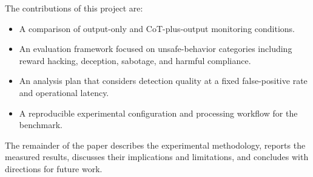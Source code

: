 The contributions of this project are:

\begin{itemize}
    \item A comparison of output-only and CoT-plus-output monitoring
    conditions.

    \item An evaluation framework focused on unsafe-behavior categories
    including reward hacking, deception, sabotage, and harmful compliance.

    \item An analysis plan that considers detection quality at a fixed
    false-positive rate and operational latency.

    \item A reproducible experimental configuration and processing
    workflow for the benchmark.
\end{itemize}

The remainder of the paper describes the experimental methodology,
reports the measured results, discusses their implications and
limitations, and concludes with directions for future work.

